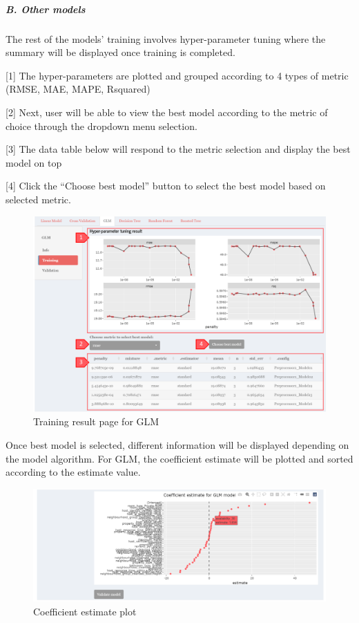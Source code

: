 \documentclass[
  12pt,
]{article}
\begin{document}
\hypertarget{b.-other-models}{%
\subparagraph{B. Other models}\label{b.-other-models}}

The rest of the models' training involves hyper-parameter tuning where
the summary will be displayed once training is completed.

{[}1{]} The hyper-parameters are plotted and grouped according to 4
types of metric (RMSE, MAE, MAPE, Rsquared)

{[}2{]} Next, user will be able to view the best model according to the
metric of choice through the dropdown menu selection.

{[}3{]} The data table below will respond to the metric selection and
display the best model on top

{[}4{]} Click the ``Choose best model'' button to select the best model
based on selected metric.

\begin{figure}[H]

{\centering \includegraphics[width=0.95\linewidth]{images/mdltrain4} 

}

\caption{Training result page for GLM}\label{fig:unnamed-chunk-29}
\end{figure}

Once best model is selected, different information will be displayed
depending on the model algorithm. For GLM, the coefficient estimate will
be plotted and sorted according to the estimate value.

\begin{figure}[H]

{\centering \includegraphics[width=0.95\linewidth]{images/mdltrain5} 

}

\caption{Coefficient estimate plot}\label{fig:unnamed-chunk-30}
\end{figure}
\end{document}
